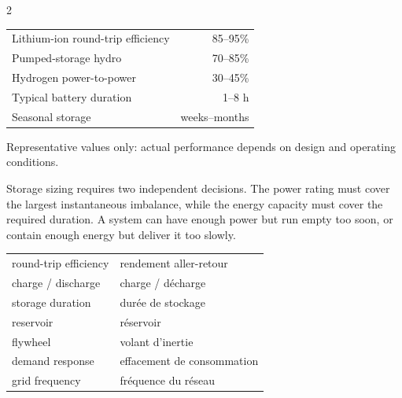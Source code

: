 \begin{multicols}{2}
\begin{keyfigures}
\begin{tabularx}{\linewidth}{@{}Xr@{}}
Lithium-ion round-trip efficiency & 85--95\%\\
Pumped-storage hydro & 70--85\%\\
Hydrogen power-to-power & 30--45\%\\
Typical battery duration & 1--8 h\\
Seasonal storage & weeks--months
\end{tabularx}
\end{keyfigures}

\begin{tcolorbox}[title=\sffamily\bfseries Storage technologies compared,colback=white,colframe=ECBlue]
\centering
{}

{\scriptsize Representative values only: actual performance depends on design and operating
conditions.}
\end{tcolorbox}

\begin{tcolorbox}[title=\sffamily\bfseries Engineering Insight,colback=white,colframe=ECOrange]
Storage sizing requires two independent decisions. The power rating must cover the largest
instantaneous imbalance, while the energy capacity must cover the required duration. A
system can have enough power but run empty too soon, or contain enough energy but deliver it
too slowly.
\end{tcolorbox}

\begin{vocabulary}
\begin{tabularx}{\linewidth}{@{}lX@{}}
round-trip efficiency & rendement aller-retour\\
charge / discharge & charge / décharge\\
storage duration & durée de stockage\\
reservoir & réservoir\\
flywheel & volant d'inertie\\
demand response & effacement de consommation\\
grid frequency & fréquence du réseau
\end{tabularx}
\end{vocabulary}


\end{multicols}
